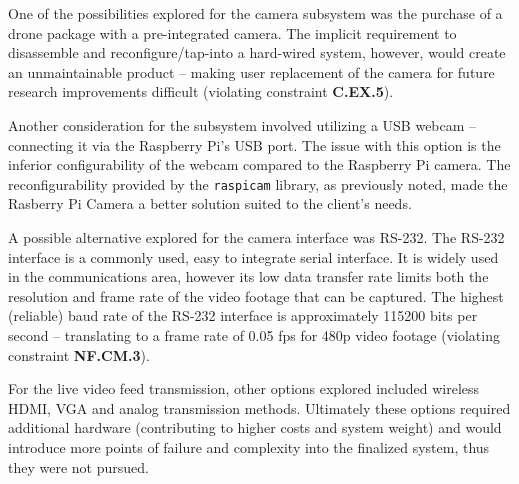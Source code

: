 One of the possibilities explored for the camera subsystem was the purchase of a drone package with a pre-integrated camera. The implicit requirement to disassemble and reconfigure/tap-into a hard-wired system, however, would create an unmaintainable product -- making user replacement of the camera for future research improvements difficult (violating constraint \textbf{C.EX.5}).

Another consideration for the subsystem involved utilizing a USB webcam -- connecting it via the Raspberry Pi's USB port. The issue with this option is the inferior configurability of the webcam compared to the Raspberry Pi camera. The reconfigurability provided by the \texttt{raspicam} library, as previously noted, made the Rasberry Pi Camera a better solution suited to the client's needs.

A possible alternative explored for the camera interface was RS-232. The RS-232 interface is a commonly used, easy to integrate serial interface. It is widely used in the communications area, however its low data transfer rate limits both the resolution and frame rate of the video footage that can be captured. The highest (reliable) baud rate of the RS-232 interface is approximately 115200 bits per second -- translating to a frame rate of 0.05 fps for 480p video footage (violating constraint \textbf{NF.CM.3}).

For the live video feed transmission, other options explored included wireless HDMI, VGA and analog transmission methods.  Ultimately these options required additional hardware (contributing to higher costs and system weight) and would introduce more points of failure and complexity into the finalized system, thus they were not pursued.
